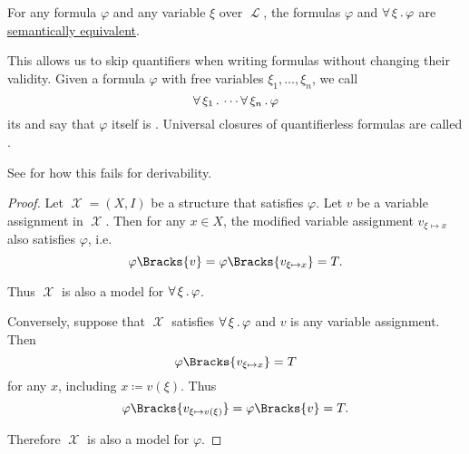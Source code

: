 \begin{proposition}\label{thm:implicit_universal_quantification}
  For any formula \( \varphi \) and any variable \( \xi \) over \( \mscrL \), the formulas \( \varphi \) and \( \forall \thinspace \xi \thinspace . \thinspace \varphi \) are \hyperref[def:first_order_semantics/equivalence]{semantically equivalent}.

  This allows us to skip quantifiers when writing formulas without changing their validity. Given a formula \( \varphi \) with free variables \( \xi_1, \ldots, \xi_n \), we call
  \begin{equation*}
    \forall \thinspace \xi_1 \thinspace . \thinspace \cdots \forall \thinspace \xi_n \thinspace . \thinspace \varphi
  \end{equation*}
  its  and say that \( \varphi \) itself is . Universal closures of quantifierless formulas are called .

  See  for how this fails for derivability.
\end{proposition}
\begin{proof}
  Let \( \mscrX = (X, I) \) be a structure that satisfies \( \varphi \). Let \( v \) be a variable assignment in \( \mscrX \). Then for any \( x \in X \), the modified variable assignment \( v_{\xi \mapsto x} \) also satisfies \( \varphi \), i.e.
  \begin{equation*}
    \varphi\Bracks{v} = \varphi\Bracks{v_{\xi \mapsto x}} = T.
  \end{equation*}

  Thus \( \mscrX \) is also a model for \( \forall \thinspace \xi \thinspace . \thinspace \varphi \).

  Conversely, suppose that \( \mscrX \) satisfies \( \forall \thinspace \xi \thinspace . \thinspace \varphi \) and \( v \) is any variable assignment. Then
  \begin{equation*}
    \varphi\Bracks{v_{\xi \mapsto x}} = T
  \end{equation*}
  for any \( x \), including \( x \coloneqq v(\xi) \). Thus
  \begin{equation*}
    \varphi\Bracks{v_{\xi \mapsto v(\xi)}} = \varphi\Bracks{v} = T.
  \end{equation*}

  Therefore \( \mscrX \) is also a model for \( \varphi \).
\end{proof}

